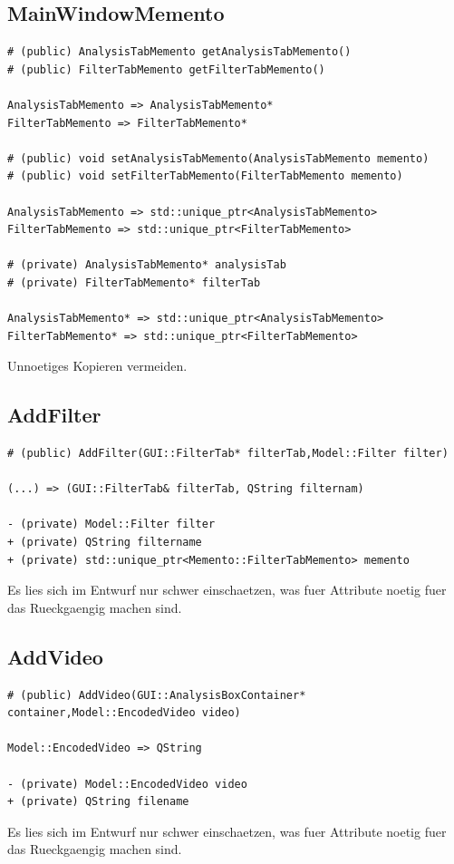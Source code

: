 \documentclass{scrartcl}
\begin{document}
{\subsection{MainWindowMemento}
\begin{verbatim}
# (public) AnalysisTabMemento getAnalysisTabMemento()
# (public) FilterTabMemento getFilterTabMemento()

AnalysisTabMemento => AnalysisTabMemento*
FilterTabMemento => FilterTabMemento*

# (public) void setAnalysisTabMemento(AnalysisTabMemento memento)
# (public) void setFilterTabMemento(FilterTabMemento memento)

AnalysisTabMemento => std::unique_ptr<AnalysisTabMemento>
FilterTabMemento => std::unique_ptr<FilterTabMemento>

# (private) AnalysisTabMemento* analysisTab
# (private) FilterTabMemento* filterTab

AnalysisTabMemento* => std::unique_ptr<AnalysisTabMemento>
FilterTabMemento* => std::unique_ptr<FilterTabMemento>

\end{verbatim}
Unnoetiges Kopieren vermeiden.
\subsection{AddFilter}
\begin{verbatim}
# (public) AddFilter(GUI::FilterTab* filterTab,Model::Filter filter)

(...) => (GUI::FilterTab& filterTab, QString filternam)

- (private) Model::Filter filter
+ (private) QString filtername
+ (private) std::unique_ptr<Memento::FilterTabMemento> memento
\end{verbatim}
Es lies sich im Entwurf nur schwer einschaetzen, was fuer Attribute noetig fuer das Rueckgaengig machen sind. 

\subsection{AddVideo}
\begin{verbatim}
# (public) AddVideo(GUI::AnalysisBoxContainer* container,Model::EncodedVideo video)

Model::EncodedVideo => QString

- (private) Model::EncodedVideo video
+ (private) QString filename
\end{verbatim}
Es lies sich im Entwurf nur schwer einschaetzen, was fuer Attribute noetig fuer das Rueckgaengig machen sind. 
}
\end{document}
